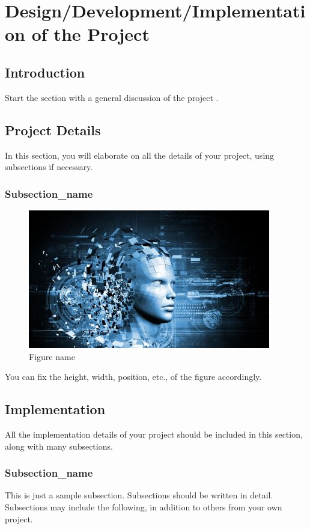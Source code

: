 \documentclass[12pt]{report}
\begin{document}
\chapter{Design/Development/Implementation of the Project}

\section{Introduction}
Start the section with a general discussion of the project  \cite{sivarajah2017critical} \cite{laney20013d} \cite{WinNT}. 

\section{Project Details}
In this section, you will elaborate on all the details of your project, using subsections if necessary.

\subsection{Subsection\_name}


\begin{figure}[h]
        \begin{center}
         \includegraphics[scale=0.9]{Figures/a1.jpg}
        \end{center}
        \caption{Figure name}
     \end{figure}

     
You can fix the height, width, position, etc., of the figure accordingly.

\section{Implementation}
All the implementation details of your project should be included in this section, along with many subsections.

\subsection{Subsection\_name}
This is just a sample subsection. Subsections should be written in detail. Subsections may include the following, in addition to others from your own project.
\end{document}
